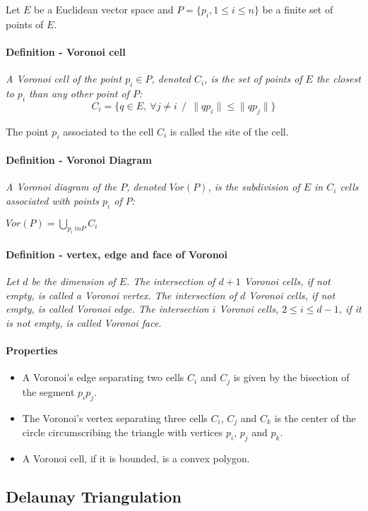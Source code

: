 Let $E$ be a Euclidean vector space and $P = \{p_{i}, 1 \le i \le n\} $ be a finite set of points of $E$.

\paragraph{Definition - Voronoi cell}
{
\it A Voronoi cell of the point $p_{i} \in P$, denoted $C_{i}$, is the set of points of $E$ the closest to $p_ {i}$ than any other point of $P$:
$$
C_{i} = \{q \in E,~\forall j \ne i~~/~~ \| qp_{i} \| \le \| qp_{j} \| \}
$$

The point $p_{i}$ associated to the cell $C_{i}$ is called the site of the cell.
}       

\paragraph{Definition - Voronoi Diagram}
{
\it A Voronoi diagram of the $P$, denoted $Vor (P)$, is the subdivision of $E$ in $C_{i}$ cells associated with points $p_{i}$ of $P$:

$
Vor (P) = \bigcup_{p_{i} \ in P} C_{i}
$
}

\paragraph{Definition - vertex, edge and face of Voronoi}
{
\it Let $d$ be the dimension of $E$. The intersection of $d + 1$ Voronoi cells, if not empty, is called a Voronoi vertex. The intersection of $d$ Voronoi cells, if not empty, is called Voronoi edge. The intersection $i$ Voronoi cells, $ 2 \le i \le d - 1$, if it is not empty, is called Voronoi face.
}

\paragraph{Properties}
{
\begin {itemize}
\item A Voronoi's edge separating two cells $C_{i}$ and $C_{j}$ is given by the bisection of the segment $p_{i}p_{j}$.
\item The Voronoi's vertex separating three cells $C_{i}$, $C_{j}$ and $C_{k}$ is the center of the circle circumscribing the triangle with vertices $p_{i}$, $p_{j}$ and $p_{k}$.
\item A Voronoi cell, if it is bounded, is a convex polygon.
\end {itemize}
}


\subsection{Delaunay Triangulation}

